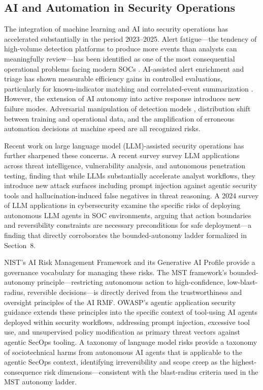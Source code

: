 \documentclass[acmlarge]{acmart}
\begin{document}
\subsection{AI and Automation in Security Operations}

The integration of machine learning and AI into security operations has accelerated
substantially in the period 2023--2025. Alert fatigue---the tendency of high-volume
detection platforms to produce more events than analysts can meaningfully
review---has been identified as one of the most consequential operational problems
facing modern SOCs \cite{verizon2025}. AI-assisted alert enrichment and triage has
shown measurable efficiency gains in controlled evaluations, particularly for
known-indicator matching and correlated-event summarization \cite{husari2017}.
However, the extension of AI autonomy into active response introduces new failure
modes. Adversarial manipulation of detection models \cite{papernot2016},
distribution shift between training and operational data, and the amplification of
erroneous automation decisions at machine speed are all recognized risks.

Recent work on large language model (LLM)-assisted security operations has further
sharpened these concerns. A recent survey \cite{ferrag2025} survey LLM applications
across threat intelligence, vulnerability analysis, and autonomous penetration
testing, finding that while LLMs substantially accelerate analyst workflows, they
introduce new attack surfaces including prompt injection against agentic security
tools and hallucination-induced false negatives in threat reasoning. A 2024 survey of LLM applications in cybersecurity \cite{motlagh2024} examine the specific risks of deploying autonomous LLM agents in
SOC environments, arguing that action boundaries and reversibility constraints are
necessary preconditions for safe deployment---a finding that directly corroborates
the bounded-autonomy ladder formalized in Section~8.

NIST's AI Risk Management Framework \cite{tabassi2023} and its Generative AI Profile
\cite{autio2024} provide a governance vocabulary for managing these risks. The MST
framework's bounded-autonomy principle---restricting autonomous action to
high-confidence, low-blast-radius, reversible decisions---is directly derived from the
trustworthiness and oversight principles of the AI RMF. OWASP's agentic application
security guidance \cite{owasp2025} extends these principles into the specific context of
tool-using AI agents deployed within security workflows, addressing prompt injection,
excessive tool use, and unsupervised policy modification as primary threat vectors against
agentic SecOps tooling. A taxonomy of language model risks \cite{weidinger2022} provide a taxonomy of
sociotechnical harms from autonomous AI agents that is applicable to the agentic SecOps
context, identifying irreversibility and scope creep as the highest-consequence risk
dimensions---consistent with the blast-radius criteria used in the MST autonomy ladder.
\end{document}
